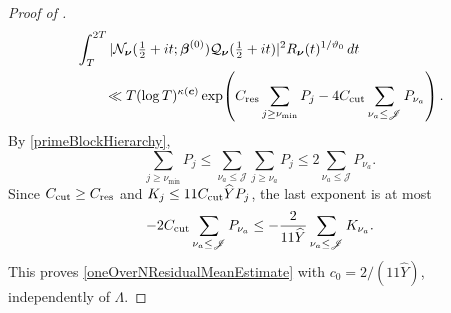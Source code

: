 \documentclass[oneside, 12pt]{amsart}
\theoremstyle{definition}
\begin{document}
{\begin{proof}[Proof of ]
			\begin{align*}
				&\int_T^{2T}
				|\mathcal N_{\boldsymbol\nu}(\tfrac12+it;
				\boldsymbol\beta^{(0)})
				\mathcal Q_{\boldsymbol\nu}(\tfrac12+it)|^2
				R_{\boldsymbol\nu}(t)^{1/\vartheta_0}\,dt\\
				&\qquad\ll T(\log T)^{\kappa(\boldsymbol c)}
				\exp\!\left(
				C_{\rm res}\sum_{j\geq\nu_{\min}}P_j
				-4C_{\rm cut}\sum_{\nu_a\leq\mathscr J}P_{\nu_a}
				\right).
			\end{align*}
			By \eqref{primeBlockHierarchy},
			\[
			\sum_{j\geq\nu_{\min}}P_j
			\leq\sum_{\nu_a\leq\mathscr J}\sum_{j\geq\nu_a}P_j
			\leq2\sum_{\nu_a\leq\mathscr J}P_{\nu_a}.
			\]
			Since $C_{\rm cut}\geq C_{\rm res}$ and
			$K_j\leq11C_{\rm cut}\widehat YP_j$, the last exponent is at most
			\[
			-2C_{\rm cut}\sum_{\nu_a\leq\mathscr J}P_{\nu_a}
			\leq-\frac2{11\widehat Y}\sum_{\nu_a\leq\mathscr J}K_{\nu_a}.
			\]
			This proves \eqref{oneOverNResidualMeanEstimate} with
			$c_0=2/(11\widehat Y)$, independently of $\Lambda$.
		\end{proof}
		
}
\end{document}
